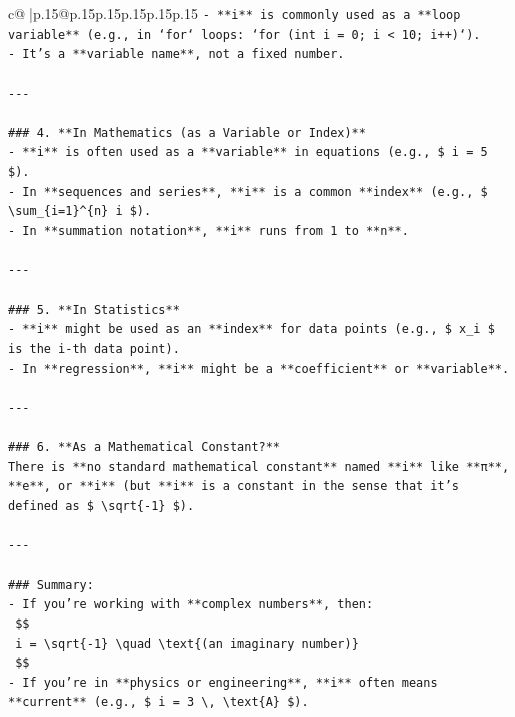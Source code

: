 \documentclass{article}
\begin{document}
{\begin{supertabular}{c@{$\;$}|p{.15\linewidth}@{}p{.15\linewidth}p{.15\linewidth}p{.15\linewidth}p{.15\linewidth}p{.15\linewidth}}
{{{\texttt{{-} **i** is commonly used as a **loop variable** (e.g., in `for` loops: `for (int i = 0; i < 10; i++)`).} \\
\texttt{{-} It's a **variable name**, not a fixed number.} \\
\\ 
\texttt{{-}{-}{-}} \\
\\ 
\texttt{\#\#\# 4. **In Mathematics (as a Variable or Index)**} \\
\texttt{{-} **i** is often used as a **variable** in equations (e.g., \$ i = 5 \$).} \\
\texttt{{-} In **sequences and series**, **i** is a common **index** (e.g., \$ \textbackslash{}sum\_\{i=1\}\^{}\{n\} i \$).} \\
\texttt{{-} In **summation notation**, **i** runs from 1 to **n**.} \\
\\ 
\texttt{{-}{-}{-}} \\
\\ 
\texttt{\#\#\# 5. **In Statistics**} \\
\texttt{{-} **i** might be used as an **index** for data points (e.g., \$ x\_i \$ is the i{-}th data point).} \\
\texttt{{-} In **regression**, **i** might be a **coefficient** or **variable**.} \\
\\ 
\texttt{{-}{-}{-}} \\
\\ 
\texttt{\#\#\# 6. **As a Mathematical Constant?**} \\
\texttt{There is **no standard mathematical constant** named **i** like **π**, **e**, or **i** (but **i** is a constant in the sense that it's defined as \$ \textbackslash{}sqrt\{{-}1\} \$).} \\
\\ 
\texttt{{-}{-}{-}} \\
\\ 
\texttt{\#\#\# Summary:} \\
\texttt{{-} If you're working with **complex numbers**, then:} \\
\texttt{  \$\$} \\
\texttt{  i = \textbackslash{}sqrt\{{-}1\} \textbackslash{}quad \textbackslash{}text\{(an imaginary number)\}} \\
\texttt{  \$\$} \\
\texttt{{-} If you're in **physics or engineering**, **i** often means **current** (e.g., \$ i = 3 \textbackslash{}, \textbackslash{}text\{A\} \$).} \\
}}}
\end{supertabular}}
\end{document}
